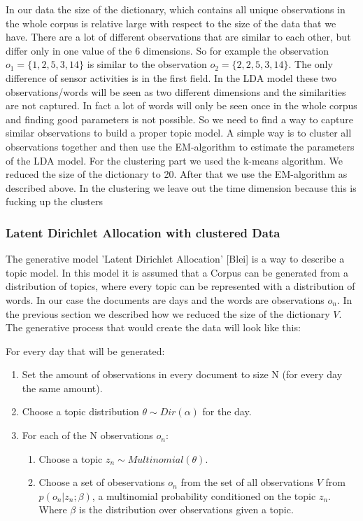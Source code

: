 \documentclass[11pt,a4paper]{article}
\begin{document}
In our data the size of the dictionary, which contains all unique observations in the whole corpus is relative large with respect to the size of the data that we have. There are a lot of different observations that are similar to each other, but differ only in one value of the 6 dimensions. So for example the observation $o_1=\{1 ,2 ,5 ,3,14\}$ is similar to the observation $o_2=\{2 ,2 ,5 ,3,14\}$. The only difference of sensor activities is in the first field. In the LDA model these two observations/words will be seen as two different dimensions and the similarities are not captured. In fact a lot of words will only be seen once in the whole corpus and finding good parameters is not possible.
 So we need to find a way to capture similar observations to build a proper topic model. A simple way is to cluster all observations together and then use the EM-algorithm to estimate the parameters of the  LDA model.
 For the clustering part we used the k-means algorithm. We reduced the size of the dictionary to 20. After that we use the EM-algorithm as described above.
 In the clustering we leave out the time dimension because this is fucking up the clusters
 
  \subsubsection{Latent Dirichlet Allocation with clustered Data}
The generative model 'Latent Dirichlet Allocation' [Blei] is a way to describe a topic model. In this model it is assumed that a Corpus can be generated from a distribution of topics, where every topic can be represented with a distribution of words. In our case the documents are days and the words are observations $o_n$. In the previous section we described how we reduced the size of the dictionary $V$.
The generative process that would create the data will look like this:

For every day that will be generated:
\begin{enumerate}
 \item Set the amount of observations in every document to size N (for every day the same amount).
 \item Choose a topic distribution $\theta \sim Dir(\alpha)$ for the day.
 \item For each of the N observations $o_n$:
 
 \begin{enumerate}
  \item Choose a topic $z_n \sim Multinomial(\theta)$.
  \item Choose a set of obeservations $o_n$ from the set of all observations $V$ from $p(o_n |z_n;\beta)$, a multinomial probability conditioned on the topic $z_n$. Where $\beta$ is the distribution over observations given a topic.
 \end{enumerate}

\end{enumerate}
\end{document}
